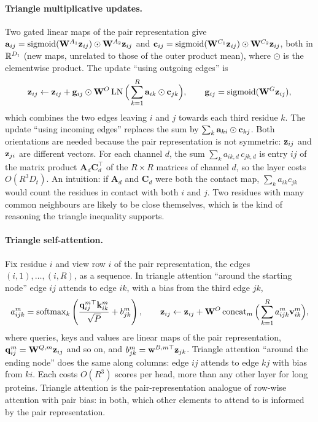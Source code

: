 \paragraph{Triangle multiplicative updates.} Two gated linear maps of the pair representation give $\mathbf{a}_{ij}=\operatorname{sigmoid}(\mathbf{W}^{A_1}\mathbf{z}_{ij})\odot\mathbf{W}^{A_2}\mathbf{z}_{ij}$ and $\mathbf{c}_{ij}=\operatorname{sigmoid}(\mathbf{W}^{C_1}\mathbf{z}_{ij})\odot\mathbf{W}^{C_2}\mathbf{z}_{ij}$, both in $\mathbb{R}^{D_t}$ (new maps, unrelated to those of the outer product mean), where $\odot$ is the elementwise product. The update ``using outgoing edges'' is
\begin{equation}
  \mathbf{z}_{ij} \leftarrow \mathbf{z}_{ij} + \mathbf{g}_{ij}\odot\mathbf{W}^O\operatorname{LN}\Big(\sum_{k=1}^R \mathbf{a}_{ik}\odot\mathbf{c}_{jk}\Big), \qquad \mathbf{g}_{ij} = \operatorname{sigmoid}(\mathbf{W}^G\mathbf{z}_{ij}),
  \label{eq:tri_mult}
\end{equation}
which combines the two edges leaving $i$ and $j$ towards each third residue $k$. The update ``using incoming edges'' replaces the sum by $\sum_k\mathbf{a}_{ki}\odot\mathbf{c}_{kj}$. Both orientations are needed because the pair representation is not symmetric: $\mathbf{z}_{ij}$ and $\mathbf{z}_{ji}$ are different vectors. For each channel $d$, the sum $\sum_k a_{ik,d}\,c_{jk,d}$ is entry $ij$ of the matrix product $\mathbf{A}_d\mathbf{C}_d^\top$ of the $R\times R$ matrices of channel $d$, so the layer costs $O(R^3D_t)$. An intuition: if $\mathbf{A}_d$ and $\mathbf{C}_d$ were both the contact map, $\sum_k a_{ik}c_{jk}$ would count the residues in contact with both $i$ and $j$. Two residues with many common neighbours are likely to be close themselves, which is the kind of reasoning the triangle inequality supports.

\paragraph{Triangle self-attention.} Fix residue $i$ and view row $i$ of the pair representation, the edges $(i,1),\dots,(i,R)$, as a sequence. In triangle attention ``around the starting node'' edge $ij$ attends to edge $ik$, with a bias from the third edge $jk$,
\begin{equation}
  a^m_{ijk} = \operatorname{softmax}_k\left(\frac{\mathbf{q}^{m\top}_{ij}\mathbf{k}^m_{ik}}{\sqrt{P}} + b^m_{jk}\right), \qquad
  \mathbf{z}_{ij} \leftarrow \mathbf{z}_{ij} + \mathbf{W}^O\operatorname{concat}_m\Big(\sum_{k=1}^R a^m_{ijk}\mathbf{v}^m_{ik}\Big),
  \label{eq:tri_att}
\end{equation}
where queries, keys and values are linear maps of the pair representation, $\mathbf{q}^m_{ij}=\mathbf{W}^{Q,m}\mathbf{z}_{ij}$ and so on, and $b^m_{jk}=\mathbf{w}^{B,m\top}\mathbf{z}_{jk}$. Triangle attention ``around the ending node'' does the same along columns: edge $ij$ attends to edge $kj$ with bias from $ki$. Each costs $O(R^3)$ scores per head, more than any other layer for long proteins. Triangle attention is the pair-representation analogue of row-wise attention with pair bias: in both, which other elements to attend to is informed by the pair representation.

